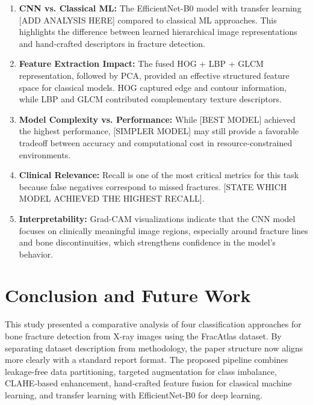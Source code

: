 \documentclass[conference]{IEEEtran}
\begin{document}
\begin{enumerate}
    \item \textbf{CNN vs. Classical ML:} The EfficientNet-B0 model with transfer learning [ADD ANALYSIS HERE] compared to classical ML approaches. This highlights the difference between learned hierarchical image representations and hand-crafted descriptors in fracture detection.

    \item \textbf{Feature Extraction Impact:} The fused HOG + LBP + GLCM representation, followed by PCA, provided an effective structured feature space for classical models. HOG captured edge and contour information, while LBP and GLCM contributed complementary texture descriptors.

    \item \textbf{Model Complexity vs. Performance:} While [BEST MODEL] achieved the highest performance, [SIMPLER MODEL] may still provide a favorable tradeoff between accuracy and computational cost in resource-constrained environments.

    \item \textbf{Clinical Relevance:} Recall is one of the most critical metrics for this task because false negatives correspond to missed fractures. [STATE WHICH MODEL ACHIEVED THE HIGHEST RECALL].

    \item \textbf{Interpretability:} Grad-CAM visualizations indicate that the CNN model focuses on clinically meaningful image regions, especially around fracture lines and bone discontinuities, which strengthens confidence in the model's behavior.
\end{enumerate}

\section{Conclusion and Future Work}

This study presented a comparative analysis of four classification approaches for bone fracture detection from X-ray images using the FracAtlas dataset. By separating dataset description from methodology, the paper structure now aligns more clearly with a standard report format. The proposed pipeline combines leakage-free data partitioning, targeted augmentation for class imbalance, CLAHE-based enhancement, hand-crafted feature fusion for classical machine learning, and transfer learning with EfficientNet-B0 for deep learning.
\end{document}
